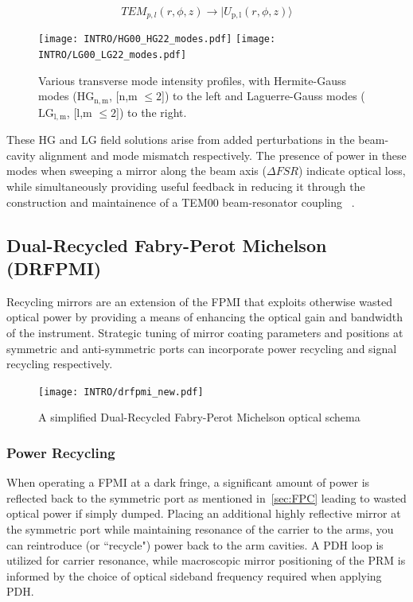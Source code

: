 $$TEM_{p,l}(r,\phi,z) \rightarrow | U_\mathrm{p,l}(r,\phi,z)\rangle$$


\begin{figure}[h!]
  \begin{subcaptiongroup}
	  \texttt{[image: INTRO/HG00\_HG22\_modes.pdf]}
	  \hspace{3.5mm}
	  \texttt{[image: INTRO/LG00\_LG22\_modes.pdf]}
  \end{subcaptiongroup}
  \hfill
  \caption{Various transverse mode intensity profiles, with Hermite-Gauss modes ($\mathrm{HG}_\mathrm{n,m}$, [n,m \hspace{.01pt} $\leq 2$]) to the left and Laguerre-Gauss modes ($\mathrm{LG}_\mathrm{l,m}$,  [l,m \hspace{.01pt} $\leq 2$]) to the right.}
  \label{fig:HGLG_modes}
\end{figure}

\newpage 
These HG and LG field solutions arise from added perturbations in the beam-cavity alignment and mode mismatch respectively. The presence of power in these modes when sweeping a mirror along the beam axis ($\Delta FSR$) indicate optical loss, while simultaneously providing useful feedback in reducing it through the construction and maintainence of a TEM00 beam-resonator coupling ~\cite{anderson:1984}. 

\subsection{Dual-Recycled Fabry-Perot Michelson (DRFPMI)}
Recycling mirrors are an extension of the FPMI that exploits otherwise wasted optical power by providing a means of enhancing the optical gain and bandwidth of the instrument. Strategic tuning of mirror coating parameters and positions at symmetric and anti-symmetric ports can incorporate power recycling and signal recycling respectively.

\begin{figure}[ht!]
\begin{center}
\texttt{[image: INTRO/drfpmi\_new.pdf]}
\end{center}
\caption{A simplified Dual-Recycled Fabry-Perot Michelson optical schema}
\label{fig:drfp_michelson}
\end{figure}

\subsubsection{Power Recycling}
When operating a FPMI at a dark fringe, a significant amount of power is reflected back to the symmetric port as mentioned in~\autoref{sec:FPC} leading to wasted optical power if simply dumped. Placing an additional highly reflective mirror at the symmetric port while maintaining resonance of the carrier to the arms, you can reintroduce (or ``recycle") power back to the arm cavities. A PDH loop is utilized for carrier resonance, while macroscopic mirror positioning of the PRM is informed by the choice of optical sideband frequency required when applying PDH. 

